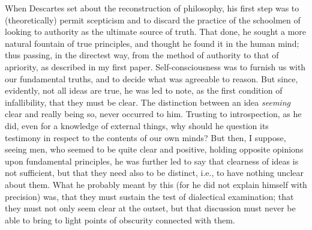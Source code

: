 \documentclass[]{article}
\begin{document}
When Descartes set about the reconstruction of philosophy, his first step was to (theoretically) permit scepticism and to discard the practice of the schoolmen of looking to authority as the ultimate source of truth. That done, he sought a more natural fountain of true  principles, and thought he found it in the human mind; thus passing, in the directest way, from the method of authority to that of apriority, as described in my first paper. Self-consciousness was to furnish us with our fundamental truths, and to decide what was agreeable to reason. But since, evidently, not all ideas are true, he was led to note, as the first condition of infallibility, that they must be clear. The distinction between an idea \emph{seeming} clear and really being so, never occurred to him.  Trusting to introspection, as he did, even for a knowledge of external things, why should he question its testimony in respect to the contents of our own minds? But then, I suppose, seeing men, who seemed to be quite clear and positive, holding opposite opinions upon fundamental principles, he was further led to say that clearness of ideas is not sufficient, but that they need also to be distinct, i.e., to have nothing unclear about them. What he probably meant by this (for he did not explain himself with precision) was, that they must sustain the test of dialectical examination; that they must not only seem clear at the outset, but that discussion must never be able to bring to light points of obscurity connected with them.
\end{document}
